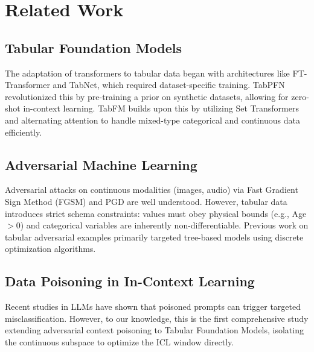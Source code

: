 \section{Related Work}
\subsection{Tabular Foundation Models}
The adaptation of transformers to tabular data began with architectures like FT-Transformer and TabNet, which required dataset-specific training. TabPFN \cite{hollmann2022tabpfn} revolutionized this by pre-training a prior on synthetic datasets, allowing for zero-shot in-context learning. TabFM \cite{kong2026tabfm} builds upon this by utilizing Set Transformers and alternating attention to handle mixed-type categorical and continuous data efficiently.

\subsection{Adversarial Machine Learning}
Adversarial attacks on continuous modalities (images, audio) via Fast Gradient Sign Method (FGSM) \cite{goodfellow2014explaining} and PGD \cite{madry2017pgd} are well understood. However, tabular data introduces strict schema constraints: values must obey physical bounds (e.g., Age $> 0$) and categorical variables are inherently non-differentiable. Previous work on tabular adversarial examples primarily targeted tree-based models using discrete optimization algorithms. 

\subsection{Data Poisoning in In-Context Learning}
Recent studies in LLMs have shown that poisoned prompts can trigger targeted misclassification. However, to our knowledge, this is the first comprehensive study extending adversarial context poisoning to Tabular Foundation Models, isolating the continuous subspace to optimize the ICL window directly.
